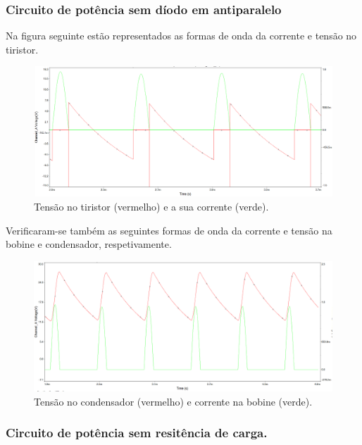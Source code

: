 \documentclass[a4paper,11pt]{article}
\numberwithin{equation}{section}
\begin{document}
 \pagebreak
 
\subsubsection{Circuito de potência sem díodo em antiparalelo}
 Na figura seguinte estão representados as formas de onda da corrente e tensão no tiristor.
 
  \begin{figure}[h]
  	\centering
  	\includegraphics[keepaspectratio=true, scale=0.365]{img/sim/tiristorsemdiodo}
  	\caption{Tensão no tiristor (vermelho) e a sua corrente (verde).}
  	\label{fig:ondbobine}
  	\vspace{-0.8em}
  \end{figure}
  
 Verificaram-se também as seguintes formas de onda da corrente e tensão na bobine e condensador, respetivamente.
 
  \begin{figure}[h]
  	\centering
  	\includegraphics[keepaspectratio=true, scale=0.365]{img/sim/semdiodocond}
  	\caption{Tensão no condensador (vermelho) e corrente na bobine (verde).}
  	\label{fig:bobine}
  	\vspace{-0.8em}
  \end{figure}

\pagebreak

\subsubsection{Circuito de potência sem resitência de carga.}
\end{document}
